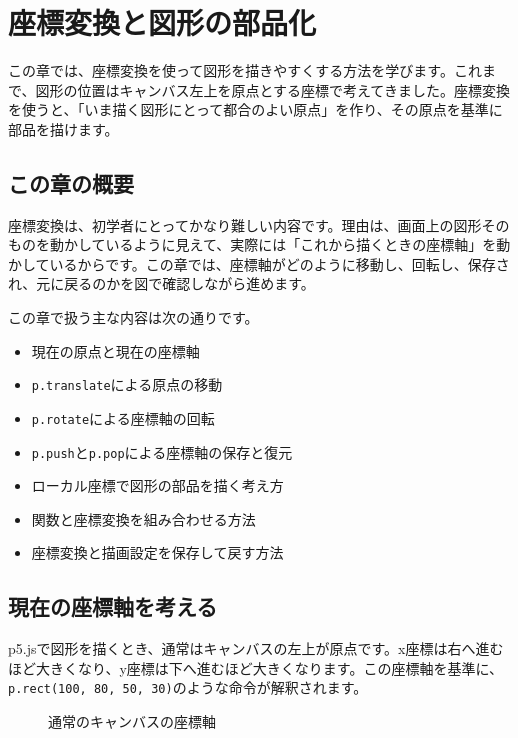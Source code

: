 \chapter{座標変換と図形の部品化}
\label{chap:coordinate-transform-parts}

この章では、座標変換を使って図形を描きやすくする方法を学びます。これまで、図形の位置はキャンバス左上を原点とする座標で考えてきました。座標変換を使うと、「いま描く図形にとって都合のよい原点」を作り、その原点を基準に部品を描けます。

\section{この章の概要}

座標変換は、初学者にとってかなり難しい内容です。理由は、画面上の図形そのものを動かしているように見えて、実際には「これから描くときの座標軸」を動かしているからです。この章では、座標軸がどのように移動し、回転し、保存され、元に戻るのかを図で確認しながら進めます。

この章で扱う主な内容は次の通りです。

\begin{itemize}
    \item 現在の原点と現在の座標軸
    \item \texttt{p.translate}による原点の移動
    \item \texttt{p.rotate}による座標軸の回転
    \item \texttt{p.push}と\texttt{p.pop}による座標軸の保存と復元
    \item ローカル座標で図形の部品を描く考え方
    \item 関数と座標変換を組み合わせる方法
    \item 座標変換と描画設定を保存して戻す方法
\end{itemize}

\section{現在の座標軸を考える}

p5.jsで図形を描くとき、通常はキャンバスの左上が原点です。x座標は右へ進むほど大きくなり、y座標は下へ進むほど大きくなります。この座標軸を基準に、\texttt{p.rect(100, 80, 50, 30)}のような命令が解釈されます。

\begin{figure}[htbp]
    \centering
    \caption{通常のキャンバスの座標軸}
    \label{fig:chapter09-normal-axis}
\end{figure}

